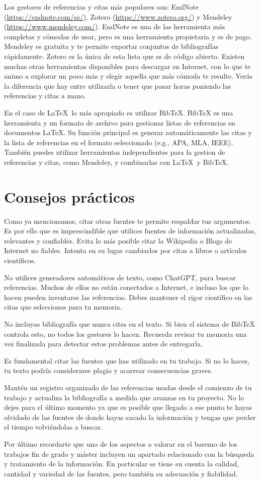 Los gestores de referencias y citas más populares son: EndNote (\url{https://endnote.com/es/}), Zotero (\url{https://www.zotero.org/}) y Mendeley (\url{https://www.mendeley.com/}). EndNote es una de las herramienta más completas y cómodas de usar, pero es una herramienta propietaria y es de pago. Mendeley es gratuita y te permite exportar conjuntos de bibliografías rápidamente. Zotero es la única de esta lista que es de código abierto. Existen muchas otras herramientas disponibles para descargar en Internet, con lo que te animo a explorar un poco más y elegir aquella que más cómoda te resulte. Verás la diferencia que hay entre utilizarla o tener que pasar horas poniendo las referencias y citas a mano.

En el caso de \LaTeX\ lo más apropiado es utilizar BibTeX. BibTeX es una herramienta y un formato de archivo para gestionar listas de referencias en documentos \LaTeX. Su función principal es generar automáticamente las citas y la lista de referencias en el formato seleccionado (e.g., APA, MLA, IEEE). También puedes utilizar herramientas independientes para la gestion de referencias y citas, como Mendeley, y combinarlas con \LaTeX\ y BibTeX.

\section{Consejos prácticos}

Como ya mencionamos, citar otras fuentes te permite respaldar tus argumentos. Es por ello que es imprescindible que utilices fuentes de información actualizadas, relevantes y confiables. Evita lo más posible citar la Wikipedia o Blogs de Internet no fiables. Intenta en su lugar cambiarlos por citas a libros o artículos científicos.

No utilices generadores automáticos de texto, como ChatGPT, para buscar referencias. Muchos de ellos no están conectados a Internet, e incluso los que lo hacen pueden inventarse las referencias. Debes mantener el rigor científico en las citas que selecciones para tu memoria.

No incluyas bibliografía que nunca cites en el texto. Si bien el sistema de BibTeX controla esto, no todos los gestores lo hacen. Recuerda revisar tu memoria una vez finalizada para detectar estos problemas antes de entregarla.

Es fundamental citar las fuentes que has utilizado en tu trabajo. Si no lo haces, tu texto podría considerarse plagio y acarrear consecuencias graves.

Mantén un registro organizado de las referencias usadas desde el comienzo de tu trabajo y actualiza la bibliografía a medida que avanzas en tu proyecto. No lo dejes para el último momento ya que es posible que llegado a ese punto te hayas olvidado de las fuentes de donde hayas sacado la información y tengas que perder el tiempo volviéndolas a buscar.

Por último recordarte que uno de los aspectos a valorar en el baremo de los trabajos fin de grado y máster incluyen un apartado relacionado con la búsqueda y tratamiento de la información. En particular se tiene en cuenta la calidad, cantidad y variedad de las fuentes, pero también su adecuación y fiabilidad. 